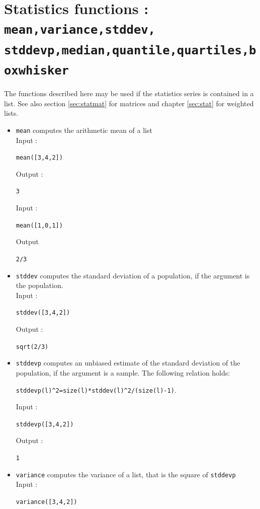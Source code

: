 \documentclass[a4paper,11pt]{book}
\begin{document}
\section{Statistics functions : {\tt mean,variance,stddev, stddevp,median,quantile,quartiles,boxwhisker}} \label{sec:statlist}
The functions described here may be used if the statistics series 
is contained in a list. See also section \ref{sec:statmat} for matrices and  
chapter \ref{sec:stat} for weighted lists.
\begin{itemize}
\item{\tt mean} computes the arithmetic mean of a list\\
Input :
\begin{center}{\tt mean([3,4,2])}\end{center}
Output :
\begin{center}{\tt  3}\end{center}
Input :
\begin{center}{\tt mean([1,0,1])}\end{center}
Output 
\begin{center}{\tt  2/3}\end{center}
\item{\tt stddev} computes the standard deviation of a population,
if the argument is the population.\\
Input :
\begin{center}{\tt stddev([3,4,2])}\end{center}
Output :
\begin{center}{\tt sqrt(2/3)}\end{center}
\item{\tt stddevp} computes an unbiased estimate of
the standard deviation of the population,
if the argument is a sample. The following
relation holds:
\begin{center}
 {\tt stddevp(l)\verb|^|2=size(l)*stddev(l)\verb|^|2/(size(l)-1)}.
\end{center}
Input :
\begin{center}{\tt stddevp([3,4,2])}\end{center}
Output :
\begin{center}{\tt 1}\end{center}
\item{\tt variance} computes the variance of a list, that is
the square of {\tt stddevp}\\
Input :
\begin{center}{\tt variance([3,4,2])}\end{center}

\end{itemize}
\end{document}
